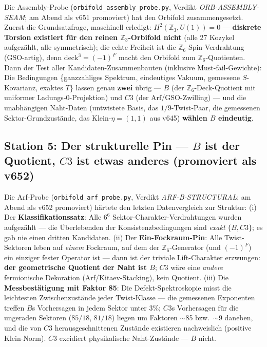 \documentclass[11pt,a4paper]{article}
\begin{document}
Die Assembly-Probe (\texttt{orbifold\_assembly\_probe.py}, Verdikt
\emph{ORB-ASSEMBLY-SEAM}; am Abend als v651 promoviert) hat den Orbifold zusammengesetzt. Zuerst
die Grundsatzfrage, maschinell erledigt: $H^2(\mathbb{Z}_3, U(1))
= 0$ --- \textbf{diskrete Torsion existiert für den reinen
$\mathbb{Z}_3$-Orbifold nicht} (alle 27 Kozykel aufgezählt, alle
symmetrisch); die echte Freiheit ist die
$\mathbb{Z}_6$-Spin-Verdrahtung (GSO-artig), denn
$\mathrm{deck}^3 = (-1)^F$ macht den Orbifold zum
$\mathbb{Z}_6$-Quotienten. Dann der Test aller
Kandidaten-Zusammenbauten (inklusive Must-fail-Gewichte): Die
Bedingungen \{ganzzahliges Spektrum, eindeutiges Vakuum, gemessene
$S$-Kovarianz, exaktes $T$\} lassen genau \textbf{zwei} übrig ---
$B$ (der $\mathbb{Z}_6$-Deck-Quotient mit uniformer
Ladungs-0-Projektion) und $C3$ (der Arf/GSO-Zwilling) --- und die
unabhängigen Naht-Daten (untwistete Basis, das $1/9$-Twist-Paar,
die gemessenen Sektor-Grundzustände, das Klein-$\eta = (1,1)$ aus
v645) \textbf{wählen $B$ eindeutig}.

\subsection*{Station 5: Der strukturelle Pin --- $B$ ist der
Quotient, $C3$ ist etwas anderes (promoviert als v652)}

Die Arf-Probe (\texttt{orbifold\_arf\_probe.py}, Verdikt
\emph{ARF-B-STRUCTURAL}; am Abend als v652 promoviert) härtete den letzten Datenvergleich zur
Struktur: (i) Der \textbf{Klassifikationssatz}: Alle $6^6$
Sektor-Charakter-Verdrahtungen wurden aufgezählt --- die
Überlebenden der Konsistenzbedingungen sind \emph{exakt}
$\{B, C3\}$; es gab nie einen dritten Kandidaten. (ii) Der
\textbf{Ein-Fockraum-Pin}: Alle Twist-Sektoren leben auf
\emph{einem} Fockraum, auf dem der $\mathbb{Z}_6$-Generator (und
$(-1)^F$) ein einziger fester Operator ist --- dann ist der
triviale Lift-Charakter erzwungen: \textbf{der geometrische
Quotient der Naht ist $B$}; $C3$ wäre eine \emph{andere}
fermionische Dekoration (Arf/Kitaev-Stacking), kein Quotient.
(iii) Die \textbf{Messbestätigung mit Faktor 85}: Die
Defekt-Spektroskopie misst die leichtesten Zwischenzustände jeder
Twist-Klasse --- die gemessenen Exponenten treffen $B$s
Vorhersagen in jedem Sektor unter 3\%; $C3$s Vorhersagen für die
ungeraden Sektoren ($85/18$, $81/18$) liegen um Faktoren
$\sim$85 bzw.\ $\sim$9 daneben, und die von $C3$ herausgeschnittenen
Zustände existieren nachweislich (positive Klein-Norm). $C3$
excidiert physikalische Naht-Zustände --- $B$ nicht.
\end{document}
